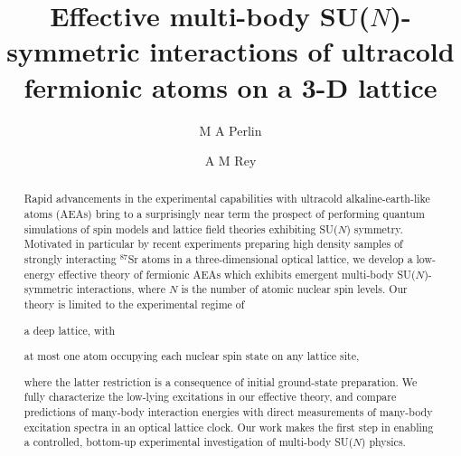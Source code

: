 \documentclass[preprint,showkeys,nofootinbib]{revtex4-1}
\newcommand{\1}{\mathds{1}}
\begin{document}
\title{Effective multi-body SU($N$)-symmetric interactions of
  ultracold fermionic atoms on a 3-D lattice}

\author{M A Perlin}
\author{A M Rey}

\begin{abstract}
  Rapid advancements in the experimental capabilities with ultracold
  alkaline-earth-like atoms (AEAs) bring to a surprisingly near term
  the prospect of performing quantum simulations of spin models and
  lattice field theories exhibiting SU($N$) symmetry.  Motivated in
  particular by recent experiments preparing high density samples of
  strongly interacting ${}^{87}$Sr atoms in a three-dimensional
  optical lattice, we develop a low-energy effective theory of
  fermionic AEAs which exhibits emergent multi-body SU($N$)-symmetric
  interactions, where $N$ is the number of atomic nuclear spin levels.
  Our theory is limited to the experimental regime of
  \begin{enumerate*}
  \item a deep lattice, with
  \item at most one atom occupying each nuclear spin state on any
    lattice site,
  \end{enumerate*}
  where the latter restriction is a consequence of initial
  ground-state preparation.  We fully characterize the low-lying
  excitations in our effective theory, and compare predictions of
  many-body interaction energies with direct measurements of many-body
  excitation spectra in an optical lattice clock.  Our work makes the
  first step in enabling a controlled, bottom-up experimental
  investigation of multi-body SU($N$) physics.
\end{abstract}


\maketitle

\begin{spacing}{1.3}
  \tableofcontents
\end{spacing}
\end{document}
